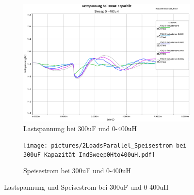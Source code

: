 \begin{figure}[H]
	\centering
	\begin{subfigure}{/13}
		\centering
		\includegraphics[width=\textwidth]{pictures/2LoadsParallel_Lastspannung bei 300uF_IndSweep0Hto400uH.pdf}
		\caption{Lastspannung bei 300uF und 0-400uH}
		\label{pic:loadvoltage_300uF}
	\end{subfigure}
	\hfill
	\begin{subfigure}{/13}
		\centering
		\texttt{[image: pictures/2LoadsParallel\_Speisestrom bei 300uF Kapazität\_IndSweep0Hto400uH.pdf]}
		\caption{Speisestrom bei 300uF und 0-400uH}
		\label{pic:supplycurrent_300uF}
	\end{subfigure}
	\caption{Lastspannung und Speisestrom bei 300uF und 0-400uH}
	\label{pic:supplycurrent_loadvoltage_300uF}
\end{figure}
